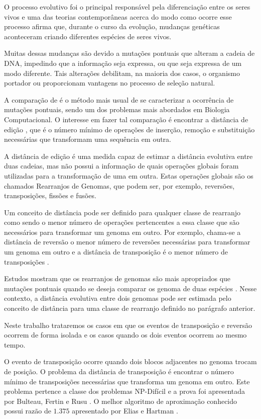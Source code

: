 O processo evolutivo foi o principal responsável pela diferenciação
entre os seres vivos e uma das teorias contemporâneas acerca do modo
como ocorre esse processo afirma que, durante o curso da evolução,
mudanças genéticas aconteceram criando diferentes espécies de seres
vivos.

Muitas dessas mudanças são devido a mutações pontuais que alteram a
cadeia de DNA, impedindo que a informação seja expressa, ou que seja
expressa de um modo diferente. Tais alterações debilitam, na maioria
dos casos, o organismo portador ou proporcionam vantagens no processo
de seleção natural.

A comparação de \seq{} é o método mais usual de se caracterizar a
ocorrência de mutações pontuais, sendo um dos problemas mais abordados
em Biologia Computacional. O interesse em fazer tal comparação é
encontrar a distância de edição \cite{SetubalMeidanis*1997}, que é o
número mínimo de operações de inserção, remoção e substituição
necessárias que transformam uma sequência em outra.

A distância de edição é uma medida capaz de estimar a distância
evolutiva entre duas cadeias, mas não possui a informação de quais
operações globais foram utilizadas para a transformação de uma
\seq{} em outra. Estas operações globais são os chamados
Rearranjos de Genomas, que podem ser, por exemplo, reversões,
transposições, fissões e fusões.

Um conceito de distância pode ser definido para qualquer classe de
rearranjo como sendo o menor número de operações pertencentes a essa
classe que são necessários para transformar um genoma em outro. Por
exemplo, chama-se a distância de reversão o menor número de reversões
necessárias para transformar um genoma em outro
\cite{BafnaPevzner*1996} e a distância de transposição é o menor
número de transposições \cite{BafnaPevzner*1998}.

Estudos mostram que os rearranjos de genomas são mais apropriados que
mutações pontuais quando se deseja comparar os genoma de duas espécies
\cite{PalmerHerbon*1988}. Nesse contexto, a distância evolutiva entre
dois genomas pode ser estimada pelo conceito de distância para uma
classe de rearranjo definido no parágrafo anterior.

Neste trabalho trataremos os casos em que os eventos de transposição e
reversão ocorrem de forma isolada e os casos quando os dois eventos
ocorrem ao mesmo tempo.

O evento de transposição ocorre quando dois blocos adjacentes no
genoma trocam de posição. O problema da distância de transposição é
encontrar o número mínimo de transposições necessárias que transforma
um genoma em outro. Este problema pertence a classe dos problemas
NP-Difícil e a prova foi apresentada por Bulteau, Fertin e
Rusu \cite{BulteauFertinRusu*2010}. O melhor algoritmo de aproximação
conhecido possui razão de $1.375$ apresentado por Elias e
Hartman \cite{EliasHartman*2006}.

